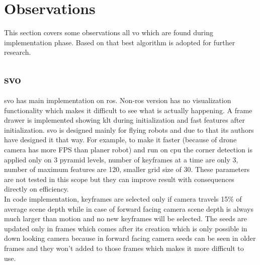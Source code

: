 \section{Observations}
This section covers some observations all \acrshort{vo} which are found during implementation phase. Based on that best algorithm is adopted for further research.
\subsection{\acrshort{svo}}
\acrshort{svo} has main implementation on \acrshort{ros}. Non-\acrshort{ros} version has no visualization functionality which makes it difficult to see what is actually happening. A frame drawer is implemented showing \acrshort{klt} during initialization and \acrshort{fast} features after initialization. \acrshort{svo} is designed mainly for flying robots and due to that its authors have designed it that way. For example, to make it faster (because of drone camera has more FPS than planer robot) and run on \acrshort{cpu} the corner detection is applied only on 3 pyramid levels, number of keyframes at a time are only 3, number of maximum features are 120, smaller grid size of 30. These parameters are not tested in this scope but they can improve result with consequences directly on efficiency. \\
\newline In code implementation, keyframes are selected only if camera travels 15\% of average scene depth while in case of forward facing camera scene depth is always much larger than motion and no new keyframes will be selected. The seeds are updated only in frames which comes after its creation which is only possible in down looking camera because in forward facing camera seeds can be seen in older frames and they won't added to those frames which makes it more difficult to use.

